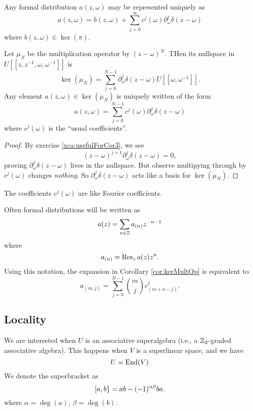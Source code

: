 \begin{cor}
Any formal distribution $a(z,\omega)$ may be represented uniquely as
\begin{equation}
a(z,\omega)=b(z,\omega) + \sum^{\infty}_{j=0}c^{j}(\omega)\partial^{j}_{\omega}\delta(z-\omega)
\end{equation}
where $b(z,\omega)\in\ker(\pi)$.
\end{cor}
\begin{cor}\label{cor:kerMultOp}
Let $\mu_{N}$ be the multiplication operator by $(z-\omega)^{N}$. THen
its nullspace in $U[[z,z^{-1},\omega,\omega^{-1}]]$ is
\begin{equation}
\ker(\mu_{N})=\sum^{N-1}_{j=0}\partial^{j}_{\omega}\delta(z-\omega)U[[\omega,\omega^{-1}]].
\end{equation}
Any element $a(z,\omega)\in\ker(\mu_N)$ is uniquely written of the form
\begin{equation}
a(z,\omega)=\sum^{N-1}_{j=0}c^{j}(\omega)\partial^{j}_{\omega}\delta(z-\omega)
\end{equation}
where $c^{j}(\omega)$ is the ``usual coefficients''.
\end{cor}
\begin{proof}
By exercise \ref{xca:usefulForCor3}, we see
\begin{equation}
(z-\omega)^{j+1}\partial_{\omega}^{j}\delta(z-\omega)=0,
\end{equation}
proving $\partial_{\omega}^{j}\delta(z-\omega)$ lives in the
nullspace. But observe multipying through by $c^{j}(\omega)$ changes
\emph{nothing}. So $\partial_{\omega}^{j}\delta(z-\omega)$ acts like a
basis for $\ker(\mu_N)$.
\end{proof}
\begin{rmk}
The coefficients $c^{j}(\omega)$ are like Fourier coefficients.
\end{rmk}
Often formal distributions will be written as 
\begin{equation}
a(z)=\sum_{n\in\ZZ}a_{(n)}z^{-n-1}
\end{equation}
where
\begin{equation}
a_{(n)}=\Res[z]{a(z)z^{n}}.
\end{equation}
Using this notation, the expansion in Corollary \ref{cor:kerMultOp} is
equivalent to 
\begin{equation}
a_{(m,j)}=\sum^{N-1}_{j=0}{m\choose j}c^{j}_{(m+n-j)}.
\end{equation}

\subsection{Locality}
\M
We are interested when $U$ is an associative superalgebra (i.e., a
$\ZZ_2$-graded associative algebra). This happens when $V$ is a
superlinear space, and we have
\begin{equation}
U=\End(V)
\end{equation}
We denote the superbracket as
\begin{equation}
\superb{a}{b}=ab-(-1)^{\alpha\beta}ba.
\end{equation}
where $\alpha=\deg(a)$, $\beta=\deg(b)$.

